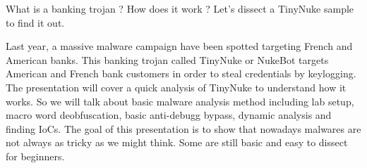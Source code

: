 \def\abstracttitle{Malware dissection 101 : TinyNuke}
\def\abstractcomment{Short Talk}
\def\abstractowner{Nha-Khanh Nguyen}

\thispagestyle{abstract}

What is a banking trojan ? How does it work ? Let's dissect a TinyNuke sample to find it out.

Last year, a massive malware campaign have been spotted targeting French and American banks.
This banking trojan called TinyNuke or NukeBot targets American and French bank customers in order to steal credentials by keylogging. The presentation will cover a quick analysis of TinyNuke to understand how it works. So we will talk about basic malware analysis method including lab setup, macro word deobfuscation, basic anti-debugg bypass, dynamic analysis and finding IoCs. The goal of this presentation is to show that nowadays malwares are not always as tricky as we might think. Some are still basic and easy to dissect for beginners.
